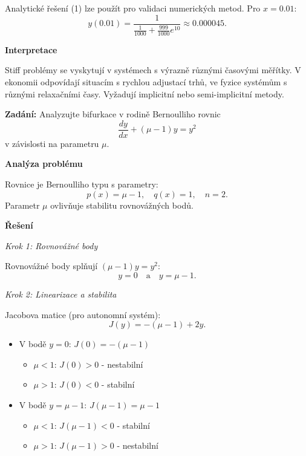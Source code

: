 \begin{example}
Analytické řešení (1) lze použít pro validaci numerických metod. Pro $x = 0.01$:
\[
y(0.01) = \frac{1}{\frac{1}{1000} + \frac{999}{1000}e^{10}} \approx 0.000045.
\]

\vspace{1.5\baselineskip}

\noindent\textbf{Interpretace}

Stiff problémy se vyskytují v systémech s výrazně různými časovými měřítky. 
V ekonomii odpovídají situacím s rychlou adjustací trhů, ve fyzice systémům 
s různými relaxačními časy. Vyžadují implicitní nebo semi-implicitní metody.

\end{example}

\vspace{2\baselineskip}

\begin{example}
\label{ex:d2-bifurkacni-analyza}

\noindent\textbf{Zadání:} Analyzujte bifurkace v rodině Bernoulliho rovnic
\[
\frac{dy}{dx} + (\mu - 1)y = y^2
\]
v závislosti na parametru $\mu$.

\vspace{1.5\baselineskip}

\noindent\textbf{Analýza problému}

\noindent Rovnice je Bernoulliho typu s parametry:
\[
p(x) = \mu - 1, \quad q(x) = 1, \quad n = 2.
\]
Parametr $\mu$ ovlivňuje stabilitu rovnovážných bodů.

\vspace{1.5\baselineskip}

\noindent\textbf{Řešení}

\noindent\textit{Krok 1: Rovnovážné body}

Rovnovážné body splňují $(\mu - 1)y = y^2$:
\[
y = 0 \quad \text{a} \quad y = \mu - 1.
\]

\noindent\textit{Krok 2: Linearizace a stabilita}

Jacobova matice (pro autonomní systém):
\[
J(y) = -(\mu - 1) + 2y.
\]
\begin{itemize}
\item V bodě $y = 0$: $J(0) = -(\mu - 1)$
  \begin{itemize}
  \item $\mu < 1$: $J(0) > 0$ - nestabilní
  \item $\mu > 1$: $J(0) < 0$ - stabilní
  \end{itemize}
\item V bodě $y = \mu - 1$: $J(\mu - 1) = \mu - 1$
  \begin{itemize}
  \item $\mu < 1$: $J(\mu - 1) < 0$ - stabilní
  \item $\mu > 1$: $J(\mu - 1) > 0$ - nestabilní
  \end{itemize}
\end{itemize}


\end{example}
